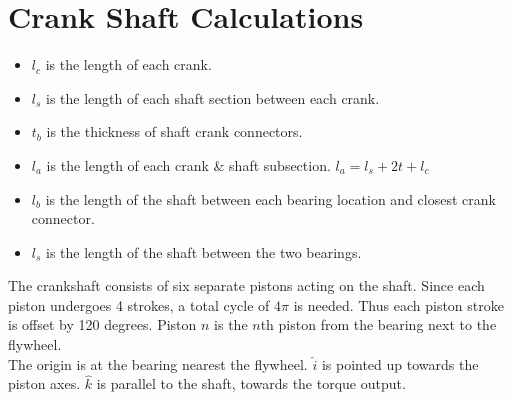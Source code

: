\documentclass[10pt,a4paper]{article}
\begin{document}
\section*{Crank Shaft Calculations}
\begin{itemize}
	\item $l_c$ is the length of each crank.
	\item $l_s$ is the length of each shaft section between each crank.
	\item $t_b$ is the thickness of shaft crank connectors.
	\item $l_a$ is the length of each crank \& shaft subsection. $l_a = l_s + 2t + l_c$
	\item $l_b$ is the length of the shaft between each bearing location and closest crank connector.
	\item $l_s$ is the length of the shaft between the two bearings.

\end{itemize}
The crankshaft consists of six separate pistons acting on the shaft. Since each piston undergoes 4 strokes, a total cycle of $4 \pi$ is needed. Thus each piston stroke is offset by 120 degrees. Piston $n$ is the $n$th piston from the bearing next to the flywheel. \\
The origin is at the bearing nearest the flywheel.
$\hat{i}$ is pointed up towards the piston axes. $\hat{k}$ is parallel to the shaft, towards the torque output.
\end{document}
